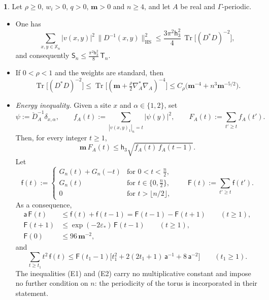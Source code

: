 \documentclass[11pt]{amsart}
\newcommand{\namedhead}{}
\theoremstyle{definition}
\newtheorem*{namedinner}{\namedhead}
\newenvironment{named}[1]{\renewcommand{\namedhead}{#1}\begin{namedinner}}{\end{namedinner}}
\begin{document}
\begin{named}{Lemma 5.10}
Let $\rho\ge0$, $w_i>0$, $q>0$, $\mathbf m>0$ and $n\ge4$, and let $A$ be real and $\Gamma$-periodic.
\begin{itemize}
\item[(a)] One has
\begin{equation*}
\sum_{x,y\in\mathbb X_n}|v(x,y)|^2\,\|D^{-1}(x,y)\|^2_{\mathrm{HS}}\le\frac{3\pi^2\mathsf h_3^2}{4}\,\operatorname{Tr}\bigl[(D^*D)^{-2}\bigr],
\end{equation*}
and consequently $\mathsf S_n\le\frac{\pi^2\mathsf h_3^2}{8}\,\mathsf T_n$.
\item[(b)] If $0<\rho<1$ and the weights are standard, then
\begin{equation*}
\operatorname{Tr}\bigl[(D^*D)^{-2}\bigr]\le\operatorname{Tr}\bigl[(\mathbf m+\tfrac\rho2\nabla_A^*\nabla_A)^{-4}\bigr]\le C_\rho\bigl(\mathbf m^{-4}+n^3\mathbf m^{-5/2}\bigr).
\end{equation*}
\item[(c)] \emph{Energy inequality.}
Given a site $x$ and $\alpha\in\{1,2\}$, set
\begin{equation*}
\psi:=\check D_A^{-1}\delta_{x,\alpha},\qquad f_A(t):=\sum_{|v(x,y)_1|_n=t}|\psi(y)|^2,\qquad F_A(t):=\sum_{t'\ge t}f_A(t').
\end{equation*}
Then, for every integer $t\ge1$,
\begin{equation*}
\mathbf m\,F_A(t)\le\mathsf h_3\sqrt{f_A(t)\,f_A(t-1)}.
\end{equation*}
Let
\begin{equation*}
\mathsf f(t):=\begin{cases}G_n(t)+G_n(-t)&\text{for }0<t<\frac n2,\\G_n(t)&\text{for }t\in\{0,\frac n2\},\\0&\text{for }t>\lfloor n/2\rfloor,\end{cases}\qquad\mathsf F(t):=\sum_{t'\ge t}\mathsf f(t').
\end{equation*}
As a consequence,
\begin{equation}
\tag{E1}
\begin{aligned}
\mathsf a\,\mathsf F(t)&\le\mathsf f(t)+\mathsf f(t-1)=\mathsf F(t-1)-\mathsf F(t+1)\qquad(t\ge1),\\
\mathsf F(t+1)&\le\exp(-2\varepsilon_*)\,\mathsf F(t-1)\qquad(t\ge1),\\
\mathsf F(0)&\le96\,\mathbf m^{-2},
\end{aligned}
\end{equation}
and
\begin{equation}
\tag{E2}
\sum_{t\ge t_1}t^2\,\mathsf f(t)\le\mathsf F(t_1-1)\bigl[t_1^2+2(2t_1+1)\,\mathsf a^{-1}+8\,\mathsf a^{-2}\bigr]\qquad(t_1\ge1).
\end{equation}
The inequalities (E1) and (E2) carry no multiplicative constant and impose no further condition on $n$: the periodicity of the torus is incorporated in their statement.
\end{itemize}
\end{named}
\end{document}
